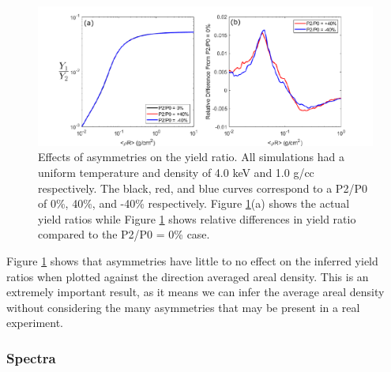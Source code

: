 	    \begin{figure}[h!]
	        \centering
	        \includegraphics[scale=0.9]{Figures/yieldRatioAsym.pdf}
	        \caption[Asymmetry Effects on Yield Ratios]{Effects of asymmetries on the yield ratio. All simulations had a uniform temperature and density of 4.0 keV and 1.0 g/cc respectively. The black, red, and blue curves correspond to a P2/P0 of 0\%, 40\%, and -40\% respectively. Figure \ref{fig:yieldRatioAsym}(a) shows the actual yield ratios while Figure \ref{fig:yieldRatioAsym} shows relative differences in yield ratio compared to the P2/P0 = 0\% case.}
	        \label{fig:yieldRatioAsym}
	    \end{figure}
	    
	    Figure \ref{fig:yieldRatioAsym} shows that asymmetries have little to no effect on the inferred yield ratios when plotted against the direction averaged areal density. This is an extremely important result, as it means we can infer the average areal density without considering the many asymmetries that may be present in a real experiment.

	\subsubsection{Spectra}
	
